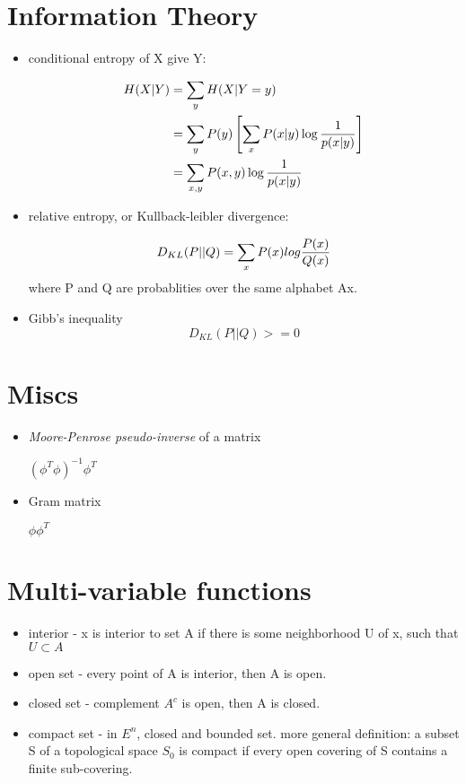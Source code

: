 \documentclass[10pt,a4paper]{book}
\begin{document}
\section{Information Theory}
\begin{itemize}
	\item conditional entropy of X give Y:
	
	\begin{align*}
	H(X|Y) &= \sum_y H(X|Y=y) \\
		   &= \sum_y P(y) \left[ \sum_x P(x|y)\log{1 \over {p(x|y)}} \right]\\
		   &= \sum_{x,y} P(x,y)\log{1 \over {p(x|y)}}
	\end{align*}
	
	\item relative entropy, or Kullback-leibler divergence:
	
	\begin{align*}
	D_{KL}(P||Q) = \sum_x P(x) log{P(x) \over Q(x)}
	\end{align*}
	where P and Q are probablities over the same alphabet Ax.
	
	\item Gibb's inequality
	$$ D_{KL}(P||Q) >= 0$$
	
\end{itemize}
\section{Miscs} 
\begin{itemize}

	\item \textit{Moore-Penrose pseudo-inverse} of a matrix
	
	$(\phi^T\phi)^{-1}\phi^T$
	
	\item Gram matrix
	
	$\phi\phi^T$
	
	
	
\end{itemize}
	
	
\section{Multi-variable functions}
\begin{itemize}
	\item interior - x is interior to set A if there is some neighborhood U of x, such that $U \subset A$
	
	\item open set - every point of A is interior, then A is open.
	
	\item closed set - complement $A^c$ is open, then A is closed.
	
	\item compact set - in $E^n$, closed and bounded set. more general definition: a subset S of a topological space $S_0$ is compact if every open covering of S contains a finite sub-covering.
	
\end{itemize}
\end{document}
